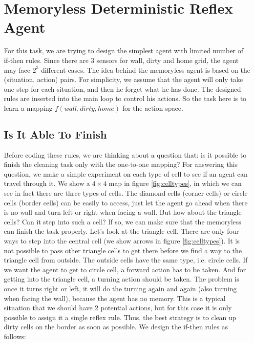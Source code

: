 \section{Memoryless Deterministic Reflex Agent}
For this task, we are trying to design the simplest agent with limited number of if-then rules. Since there are 3 sensors for wall, dirty and home grid, the agent may face $2^3$ different cases. The idea behind the memoryless agent is based on the (situation, action) pairs. For simplicity, we assume that the agent will only take one step for each situation, and then he forget what he has done. The designed rules are inserted into the main loop to control his actions. So the task here is to learn a mapping $f(wall, dirty, home)$ for the action space.   

\subsection{Is It Able To Finish}
Before coding these rules, we are thinking about a question that: is it possible to finish the cleaning task only with the one-to-one mapping? For answering this question, we make a simple experiment on each type of cell to see if an agent can travel through it. We show a $4 \times 4$ map in figure \ref{fig:celltypes}, in which we can see in fact there are three types of cells. The diamond cells (corner cells) or circle cells (border cells) can be easily to access, just let the agent go ahead when
there is no wall and turn left or right when facing a wall. But how about the triangle cells? Can it step into such a cell? If so, we can make sure that the memoryless can finish the task properly. Let's look at the triangle cell. There are only four ways to step into the central cell (we show arrows in figure \ref{fig:celltypes}). It is not possible to pass other triangle cells to get there before we find a way to the triangle cell from outside. The outside cells have the same type, i.e.
circle cells. If we want the agent to get to circle cell, a forward action has to be taken. And for getting into the triangle cell, a turning action should be taken. The problem is once it turns right or left, it will do the turning again and again (also turning when facing the wall), because the agent has no memory. This is a typical situation that we should have 2 potential actions, but for this case it is only possible to assign it a single reflex rule. Thus, the best strategy is to
clean up dirty cells on the border as soon as possible. We design the if-then rules as follows:

